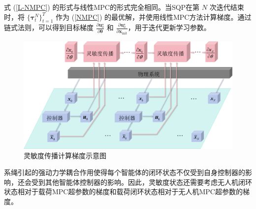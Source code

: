 \documentclass[lang=chs, degree=master, blindreview=true, winfonts=true]{yanputhesis}
\begin{document}
式 (\ref{L-NMPC}) 的形式与线性MPC的形式完全相同。当SQP在第 \( N \) 次迭代结束时，将 \( \{\bm \tau_t^N \}_{t=1}^{T} \) 作为 (\ref{NMPC}) 的最优解，并使用线性MPC方法计算梯度\cite{tao2024difftune}。通过链式法则，可以得到目标梯度 \( \frac{\partial \bm u_0^\star}{\partial \bm \theta} \) 和 \( \frac{\partial \bm u_0^\star}{\partial \bm x_{\text{init}}} \)，用于迭代更新学习参数。

\begin{figure}[hbt!]
	\centering
	\includegraphics[width=32pc]{picture/图片1.png} 
	\caption{灵敏度传播计算梯度示意图} 
	\label{system}
\end{figure}



系绳引起的强动力学耦合作用使得每个智能体的闭环状态不仅受到自身控制器的影响，还会受到其他智能体控制器的影响。因此，灵敏度状态还需要考虑无人机闭环状态相对于载荷MPC超参数的梯度和载荷闭环状态相对于无人机MPC超参数的梯度。
\end{document}

